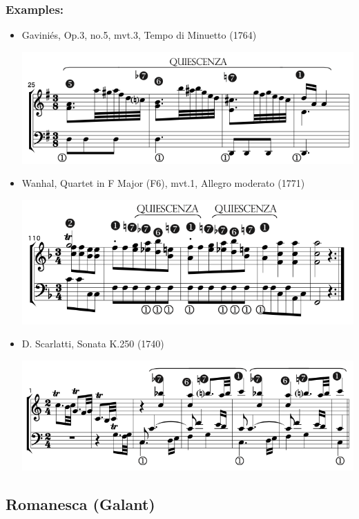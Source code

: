 ﻿\documentclass[11pt, openany]{article}
\begin{document}
\begin{itemize}
\subsubsection{Examples:}
\begin{itemize}
\item Gaviniés, Op.3, no.5, mvt.3, Tempo di Minuetto (1764)
\begin{center}
\includegraphics[scale=0.5]{gavinies3.png}
\end{center}
\item Wanhal, Quartet in F Major (F6), mvt.1, Allegro moderato (1771)
\begin{center}
\includegraphics[scale=0.5]{wanhal6.png}
\end{center}
\item D. Scarlatti, Sonata K.250 (1740)
\begin{center}
\includegraphics[scale=0.5]{scarlatti250.png}
\end{center}
\end{itemize}


	\subsection{Romanesca (Galant)}
	

\end{itemize}
\end{document}
